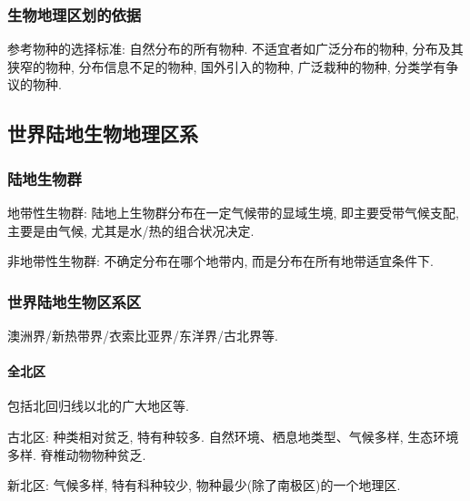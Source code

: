 \documentclass{ctexart}
\begin{document}
\subsubsection{生物地理区划的依据} %
\label{ssub:生物地理区划的依据}

参考物种的选择标准: 自然分布的所有物种. 不适宜者如广泛分布的物种, 分布及其狭窄的物种, 分布信息不足的物种, 国外引入的物种, 广泛栽种的物种, 分类学有争议的物种.



\subsection{世界陆地生物地理区系} %
\label{sub:世界陆地生物地理区系}

\subsubsection{陆地生物群} %
\label{ssub:陆地生物群}

地带性生物群: 陆地上生物群分布在一定气候带的显域生境, 即主要受带气候支配, 主要是由气候, 尤其是水/热的组合状况决定.
\par
非地带性生物群: 不确定分布在哪个地带内, 而是分布在所有地带适宜条件下.


\subsubsection{世界陆地生物区系区} %
\label{ssub:世界陆地生物区系区}

澳洲界/新热带界/衣索比亚界/东洋界/古北界等.

\paragraph{全北区} %
\label{par:全北区}

包括北回归线以北的广大地区等.
\begin{cenum}
    \item 古北区: 种类相对贫乏, 特有种较多. 自然环境、栖息地类型、气候多样, 生态环境多样. 脊椎动物物种贫乏.
    \item 新北区: 气候多样, 特有科种较少, 物种最少(除了南极区)的一个地理区.
\end{cenum}

\end{document}

